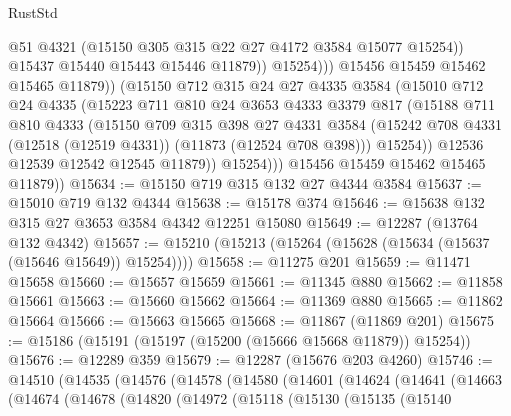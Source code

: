 \begin{lexlean}{RustStd}
\begin{coremodule}
                            @51
                            @4321
                            (@15150 @305 @315 @22 @27 @4172 @3584 @15077 @15254))
                          @15437
                          @15440
                          @15443
                          @15446
                          @11879))
                      @15254)))
                @15456
                @15459
                @15462
                @15465
                @11879))
            (@15150
              @712
              @315
              @24
              @27
              @4335
              @3584
              (@15010
                @712
                @24
                @4335
                (@15223
                  @711
                  @810
                  @24
                  @3653
                  @4333
                  @3379
                  @817
                  (@15188
                    @711
                    @810
                    @4333
                    (@15150
                      @709
                      @315
                      @398
                      @27
                      @4331
                      @3584
                      (@15242 @708 @4331 (@12518 (@12519 @4331)) (@11873 (@12524 @708 @398)))
                      @15254))
                  @12536
                  @12539
                  @12542
                  @12545
                  @11879))
              @15254)))
        @15456
        @15459
        @15462
        @15465
        @11879))
@15634 := @15150 @719 @315 @132 @27 @4344 @3584
@15637 := @15010 @719 @132 @4344
@15638 := @15178 @374
@15646 := @15638 @132 @315 @27 @3653 @3584 @4342 @12251 @15080
@15649 := @12287 (@13764 @132 @4342)
@15657 := @15210 (@15213 (@15264 (@15628 (@15634 (@15637 (@15646 @15649)) @15254))))
@15658 := @11275 @201
@15659 := @11471 @15658
@15660 := @15657 @15659
@15661 := @11345 @880
@15662 := @11858 @15661
@15663 := @15660 @15662
@15664 := @11369 @880
@15665 := @11862 @15664
@15666 := @15663 @15665
@15668 := @11867 (@11869 @201)
@15675 := @15186 (@15191 (@15197 (@15200 (@15666 @15668 @11879)) @15254))
@15676 := @12289 @359
@15679 := @12287 (@15676 @203 @4260)
@15746 := @14510
    (@14535
      (@14576
        (@14578
          (@14580
            (@14601
              (@14624
                (@14641
                  (@14663
                    (@14674
                      (@14678
                        (@14820
                          (@14972
                            (@15118
                              (@15130
                                (@15135
                                  (@15140

\end{coremodule}
\end{lexlean}

